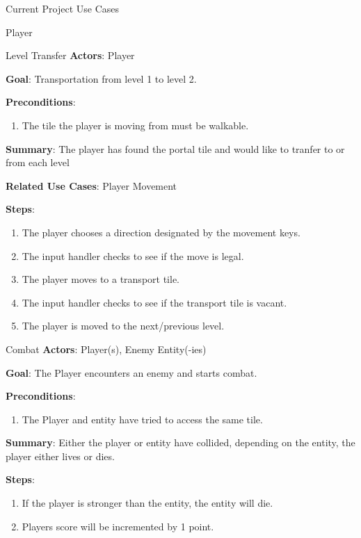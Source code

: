 \documentclass[12pt]{report}
\begin{document}
\begin{chapter}{Current Project Use Cases}
\begin{section}{Player}
    \begin{subsection}{Level Transfer}
      \textbf{Actors}:
      Player

      \textbf{Goal}:
      Transportation from level 1 to level 2.

      \textbf{Preconditions}:
      \begin{enumerate}
        \item The tile the player is moving from must be walkable.
      \end{enumerate}

      \textbf{Summary}:
      The player has found the portal tile and would like to tranfer to or from each level

      \textbf{Related Use Cases}:
      Player Movement

      \textbf{Steps}:
      \begin{enumerate}
        \item The player chooses a direction designated by the movement keys.
        \item The input handler checks to see if the move is legal.
        \item The player moves to a transport tile.
        \item The input handler checks to see if the transport tile is vacant.
        \item The player is moved to the next/previous level.
      \end{enumerate}
    \end{subsection}


    \begin{subsection}{Combat}
      \textbf{Actors}:
      Player(s), Enemy Entity(-ies)

      \textbf{Goal}:
      The Player encounters an enemy and starts combat.

      \textbf{Preconditions}:
      \begin{enumerate}
        \item The Player and entity have tried to access the same tile.
      \end{enumerate}

      \textbf{Summary}:
      Either the player or entity have collided, depending on the entity, the player either lives or dies.

      \textbf{Steps}:
      \begin{enumerate}
        \item If the player is stronger than the entity, the entity will die.
        \item Players score will be incremented by 1 point.
      \end{enumerate}


\end{subsection}
\end{section}
\end{chapter}
\end{document}
